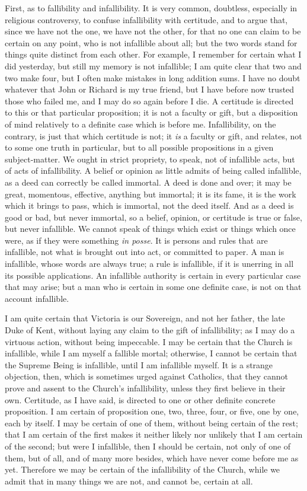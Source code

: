 First, as to fallibility and infallibility. It is very common,
doubtless, especially in religious controversy, to confuse
infallibility with certitude, and to argue that, since we have not the
one, we have not the other, for that no one can claim to be certain on
any point, who is not infallible about all; but the two words stand
for things quite distinct from each other. For example, I remember for
certain what I did yesterday, but still my memory is not infallible; I
am quite clear that two and two make four, but I often make mistakes
in long addition sums. I have no doubt whatever that John or Richard
is my true friend, but I have before now trusted those who failed me,
and I may do so again before I die. A certitude is directed to this or
that particular proposition; it is not a faculty or gift, but a
disposition of mind relatively to a definite case which is before me.
Infallibility, on the contrary, is just that which certitude is not;
it \emph{is} a faculty or gift, and relates, not to some one truth in
particular, but to all possible propositions in a given
subject-matter. We ought in strict propriety, to speak, not of
infallible acts, but of acts of infallibility. A belief or opinion as
little admits of being called infallible, as a deed can correctly be
called immortal. A deed is done and over; it may be great, momentous,
effective, anything but immortal; it is its fame, it is the work
which it brings to pass, which is immortal, not the deed itself. And
as a deed is good or bad, but never immortal, so a belief, opinion, or
certitude is true or false, but never infallible. We cannot speak of
things which exist or things which once were, as if they were
something \emph{in posse}. It is persons and rules that are
infallible, not what is brought out into act, or committed to paper. A
man is infallible, whose words are always true; a rule is infallible,
if it is unerring in all its possible applications. An infallible
authority is certain in every particular case that may arise; but a
man who is certain in some one definite case, is not on that account
infallible.

I am quite certain that Victoria is our Sovereign, and not her
father, the late Duke of Kent, without laying any claim to the gift of
infallibility; as I may do a virtuous action, without being
impeccable. I may be certain that the Church is infallible, while I am
myself a fallible mortal; otherwise, I cannot be certain that the
Supreme Being is infallible, until I am infallible myself. It is a
strange objection, then, which is sometimes urged against Catholics,
that they cannot prove and assent to the Church's infallibility,
unless they first believe in their own. Certitude, as I have said, is
directed to one or other definite concrete proposition. I am certain
of proposition one, two, three, four, or five, one by one, each by
itself. I may be certain of one of them, without being certain of the
rest; that I am certain of the first makes it neither likely nor
unlikely that I am certain of the second; but were I infallible,
then I should be certain, not only of one of them, but of all, and of
many more besides, which have never come before me as yet. Therefore
we may be certain of the infallibility of the Church, while we admit
that in many things we are not, and cannot be, certain at all.

